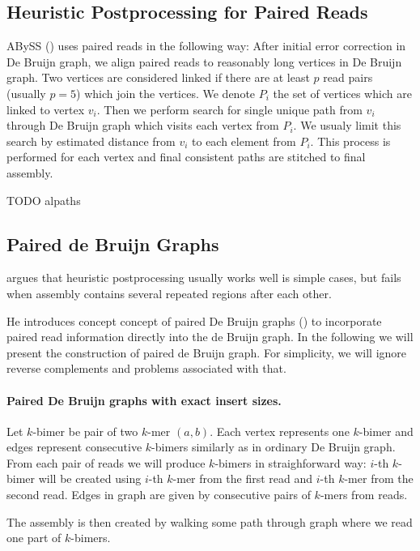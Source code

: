 \subsection{Heuristic Postprocessing for Paired Reads}

ABySS (\cite{Abyss}) uses paired reads in the following way:
After initial error correction in De Bruijn graph, we align paired reads
to reasonably long vertices in De Bruijn graph. Two vertices are considered linked
if there are at least $p$ read pairs (usually $p=5$) which join the vertices.
We denote $P_i$ the set of vertices which are linked to vertex $v_i$.
Then we perform search for single unique path from $v_i$ through De Bruijn graph which visits
each vertex from $P_i$. We usualy limit this search by estimated distance from $v_i$ to each element
from $P_i$. This process is performed for each vertex and final consistent paths are stitched to final assembly.

TODO alpaths

\subsection{Paired de Bruijn Graphs}

\citet{Paired} argues that heuristic postprocessing
usually works well is simple cases, but fails when assembly contains
several repeated regions after each other.

He introduces concept concept of paired De Bruijn graphs (\cite{Paired}) to incorporate paired read
information directly into the de Bruijn graph.
In the following we will present the construction of 
paired de Bruijn graph.
For simplicity, we will ignore reverse complements and problems associated with that.

\paragraph{Paired De Bruijn graphs with exact insert sizes.}
Let $k$-bimer be pair of two $k$-mer $(a, b)$. Each vertex represents one $k$-bimer and edges represent
consecutive $k$-bimers similarly as in ordinary De Bruijn graph. 
From each pair of reads we will produce $k$-bimers in straighforward way:
$i$-th $k$-bimer will be created using $i$-th $k$-mer from the first read and $i$-th $k$-mer from the second read.
Edges in graph are given by consecutive pairs of $k$-mers from reads.

The assembly is then created by walking some path through graph where we read one part of $k$-bimers.

